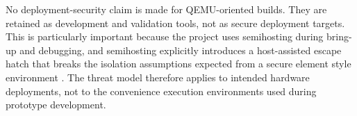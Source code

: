 No deployment-security claim is made for QEMU-oriented builds. They are
retained as development and validation tools, not as secure deployment targets.
This is particularly important because the project
uses semihosting during bring-up and debugging, and semihosting explicitly
introduces a host-assisted escape hatch that breaks the isolation assumptions
expected from a secure element style environment \cite{qemu-security,
qemu-semihosting}. The threat model therefore applies to intended hardware
deployments, not to the convenience execution environments used during
prototype development.


